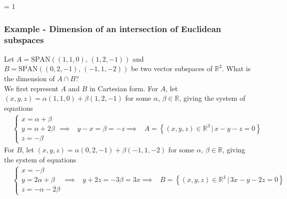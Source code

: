 \documentclass[usenames,dvipsnames,aspectratio=169,10pt]{beamer}
\def \EXAMPLEVERSION {3} %
\numberwithin{equation}{section}
\begin{document}
\ifnum \EXAMPLEVERSION = 1
\begin{frame}
\frametitle{Example - Dimension of an intersection of Euclidean subspaces}
\noindent Let $A=\text{SPAN}((1,1,0),\,(1,2,-1))$ and $B=\text{SPAN}((0,2,-1),\,(-1,1,-2))$ be two vector subspaces of $\mathbb{R}^3$. What is the dimension of $A \cap B$? \\

\noindent We first represent $A$ and $B$ in Cartesian form. For $A$, let $(x,y,z)=\alpha(1,1,0) + \beta(1,2,-1)$ for some $\alpha$, $\beta \in \mathbb{R}$, giving the system of equations
\begin{align*}
&\begin{cases}
x = \alpha + \beta \\
y = \alpha + 2\beta \\
z = -\beta
\end{cases}
\implies & y-x = \beta = -z
\implies & A = \left\{ (x,y,z)\in\mathbb{R}^3 \, | \, x - y - z = 0\right\}
\end{align*}
For $B$, let $(x,y,z)=\alpha(0,2,-1) + \beta(-1,1,-2)$ for some $\alpha$, $\beta \in \mathbb{R}$, giving the system of equations
\begin{align*}
&\begin{cases}
x = -\beta \\
y = 2\alpha + \beta \\
z = -\alpha - 2\beta
\end{cases}
\implies & y+2z = -3\beta = 3x
\implies & B = \left\{ (x,y,z)\in\mathbb{R}^3 \, | \, 3x - y - 2z = 0\right\}
\end{align*}

\end{frame}
\end{document}
